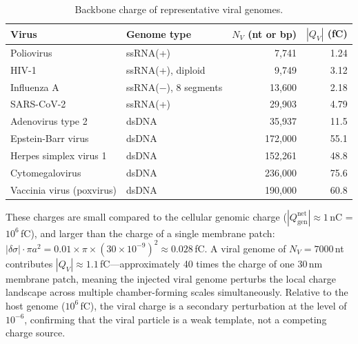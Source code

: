 \documentclass[11pt,twocolumn,a4paper]{article}
\theoremstyle{definition}
\theoremstyle{remark}
\newcommand{\Qgen}{Q_{\mathrm{gen}}}
\newcommand{\abs}[1]{\left|#1\right|}
\begin{document}
\begin{table}[h]
\centering
\caption{Backbone charge of representative viral genomes.}
\label{tab:viral_charges}
\begin{tabular}{llrr}
\toprule
Virus & Genome type & $N_V$ (nt or bp) & $\abs{Q_V}$ (fC) \\
\midrule
Poliovirus & ssRNA(+) & 7,741 & 1.24 \\
HIV-1 & ssRNA(+), diploid & 9,749 & 3.12 \\
Influenza A & ssRNA($-$), 8 segments & 13,600 & 2.18 \\
SARS-CoV-2 & ssRNA(+) & 29,903 & 4.79 \\
Adenovirus type 2 & dsDNA & 35,937 & 11.5 \\
Epstein-Barr virus & dsDNA & 172,000 & 55.1 \\
Herpes simplex virus 1 & dsDNA & 152,261 & 48.8 \\
Cytomegalovirus & dsDNA & 236,000 & 75.6 \\
Vaccinia virus (poxvirus) & dsDNA & 190,000 & 60.8 \\
\bottomrule
\end{tabular}
\end{table}

These charges are small compared to the cellular genomic charge ($\abs{\Qgen^{\mathrm{net}}} \approx 1$\,nC = $10^6$\,fC), and larger than the charge of a single membrane patch: $\abs{\delta\sigma} \cdot \pi a^2 = 0.01 \times \pi \times (30 \times 10^{-9})^2 \approx 0.028$\,fC. A viral genome of $N_V = 7000$\,nt contributes $\abs{Q_V} \approx 1.1$\,fC---approximately 40 times the charge of one 30\,nm membrane patch, meaning the injected viral genome perturbs the local charge landscape across multiple chamber-forming scales simultaneously. Relative to the host genome ($10^6$\,fC), the viral charge is a secondary perturbation at the level of $10^{-6}$, confirming that the viral particle is a weak template, not a competing charge source.
\end{document}

